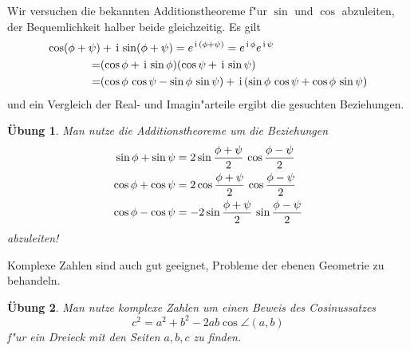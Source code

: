 \documentclass[11pt]{article}
\newtheorem{uebung}{\"{U}bung}
\begin{document}
Wir versuchen die bekannten Additionstheoreme f"ur $\sin$ und $\cos$
abzuleiten, der Bequemlichkeit halber beide gleichzeitig. Es gilt
\begin{align}
  \cos(\phi+\psi)&+\,\mathrm{i}\,\sin(\phi+\psi)=e^{\,\mathrm{i}\,(\phi+\psi)}
  =e^{\,\mathrm{i}\,\phi}e^{\,\mathrm{i}\,\psi}\notag\\
  =&(\cos\phi+\,\mathrm{i}\,\sin\phi)(\cos\psi+\,\mathrm{i}\,\sin\psi)\\
  =&(\cos\phi\,\cos\psi-\sin\phi\,\sin\psi)
  +\,\mathrm{i}\,(\sin\phi\,\cos\psi+\cos\phi\,\sin\psi)\notag
\end{align}
und ein Vergleich der Real- und Imagin"arteile ergibt die gesuchten
Beziehungen. 

\begin{uebung}
  Man nutze die Additionstheoreme um die Beziehungen
  \begin{align}
    \sin\phi+\sin\psi&=2\sin\frac{\phi+\psi}2\,\cos\frac{\phi-\psi}2\notag\\
    \cos\phi+\cos\psi&=2\cos\frac{\phi+\psi}2\,\cos\frac{\phi-\psi}2\\
    \cos\phi-\cos\psi&=-2\sin\frac{\phi+\psi}2\,\sin\frac{\phi-\psi}2\notag
  \end{align}
  abzuleiten!
\end{uebung}

Komplexe Zahlen sind auch gut geeignet, Probleme der ebenen Geometrie zu 
behandeln. 
\begin{uebung}
  Man nutze komplexe Zahlen um einen Beweis des Cosinussatzes
  \begin{equation*}
    c^2=a^2+b^2-2ab\cos\angle(a,b)
  \end{equation*}
  f"ur ein Dreieck mit den Seiten $a,b,c$ zu finden.
\end{uebung}
%
\end{document}
